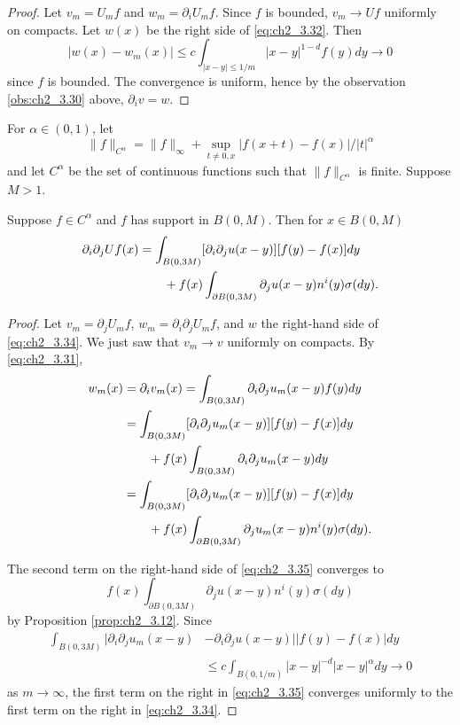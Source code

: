 \begin{proof}
Let $v_m = U_mf$ and $w_m = \partial_iU_mf$. Since $f$ is bounded, $v_m \to Uf$ uniformly on compacts. Let $w(x)$ be the right side of \eqref{eq:ch2_3.32}. Then
\mpagebreak
\[
    |w(x) - w_m(x)| \leq c \int_{|x-y|\leq 1/m} |x-y|^{1-d}f(y)dy \to 0
\]
since $f$ is bounded. The convergence is uniform, hence by the observation \eqref{obs:ch2_3.30} above, $\partial_iv = w$.
\end{proof}

For $\alpha \in (0,1)$, let
\begin{equation}\label{eq:ch2_3.33}
    \|f\|_{C^\alpha} = \|f\|_\infty + \sup_{t\neq 0,x} |f(x+t) - f(x)|/|t|^\alpha
\end{equation}
and let $C^\alpha$ be the set of continuous functions such that $\|f\|_{C^\alpha}$ is finite. Suppose $M > 1$.

\begin{proposition}\label{prop:ch2_3.13}
Suppose $f \in C^\alpha$ and $f$ has support in $B(0,M)$. Then for $x \in B(0,M)$
\begin{align}\label{eq:ch2_3.34}
    \partial_i\partial_jUf(x) &= \int_{B(0,3M)} [\partial_i\partial_ju(x-y)][f(y) - f(x)]dy \\
    &\qquad+ f(x)\int_{\partial B(0,3M)} \partial_ju(x-y)n^i(y)\sigma(dy). \notag
\end{align}
\end{proposition}

\begin{proof}
Let $v_m = \partial_jU_mf$, $w_m = \partial_i\partial_jU_mf$, and $w$ the right-hand side of \eqref{eq:ch2_3.34}. We just saw that $v_m \to v$ uniformly on compacts. By \eqref{eq:ch2_3.31},
\begin{align}\label{eq:ch2_3.35}
    w_m(x) &= \partial_iv_m(x) = \int_{B(0,3M)} \partial_i\partial_ju_m(x-y)f(y)dy \\
    &= \int_{B(0,3M)} [\partial_i\partial_ju_m(x-y)][f(y) - f(x)]dy \notag \\
    &\qquad+ f(x)\int_{B(0,3M)} \partial_i\partial_ju_m(x-y)dy \notag \\
    &= \int_{B(0,3M)} [\partial_i\partial_ju_m(x-y)][f(y) - f(x)]dy \notag \\
    &\qquad+ f(x)\int_{\partial B(0,3M)} \partial_ju_m(x-y)n^i(y)\sigma(dy). \notag
\end{align}

The second term on the right-hand side of \eqref{eq:ch2_3.35} converges to
\[
    f(x)\int_{\partial B(0,3M)} \partial_ju(x-y)n^i(y)\sigma(dy)
\]
by Proposition \ref{prop:ch2_3.12}. Since
\begin{align*}
    \int_{B(0,3M)} |\partial_i\partial_ju_m(x-y) &- \partial_i\partial_ju(x-y)||f(y) - f(x)|dy \\
    &\leq c\int_{B(0,1/m)} |x-y|^{-d}|x-y|^\alpha dy \to 0
\end{align*}
\mnewpage
as $m \to \infty$, the first term on the right in \eqref{eq:ch2_3.35} converges uniformly to the first term on the right in \eqref{eq:ch2_3.34}.
\end{proof}

